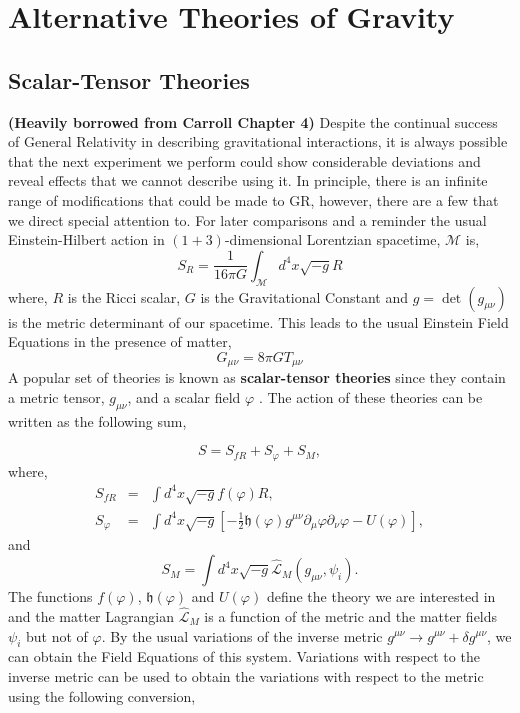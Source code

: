 \chapter{Alternative Theories of Gravity}
\section{Scalar-Tensor Theories}
\textbf{(Heavily borrowed from Carroll Chapter 4)} Despite the continual success of General Relativity in describing gravitational interactions, it is always possible that the next experiment we perform could show considerable deviations and reveal effects that we cannot describe using it. In principle, there is an infinite range of modifications that could be made to GR, however, there are a few that we direct special attention to. For later comparisons and a reminder the usual Einstein-Hilbert action in $(1+3)$-dimensional Lorentzian spacetime, $\mathcal{M}$ is,
\begin{equation}
    S_{R} = \frac{1}{16\pi G}\int_{\mathcal{M}} d^4 x\sqrt{-g}R
\end{equation}
where, $R$ is the Ricci scalar, $G$ is the Gravitational Constant and $g = \det(g_{\mu\nu})$ is the metric determinant of our spacetime. This leads to the usual Einstein Field Equations in the presence of matter, 
\begin{equation}\label{efes}
    G_{\mu\nu} = 8\pi GT_{\mu\nu}
\end{equation}
A popular set of theories is known as \textbf{scalar-tensor theories} since they contain a metric tensor, $g_{\mu\nu}$, and a scalar field $\varphi$ \citep{carrolGravity}. The action of these theories can be written as the following sum, 

\begin{equation}
    S = S_{fR} + S_{\varphi} + S_M,
\end{equation}
where,
\begin{eqnarray}\label{st-actions}
    S_{fR} &=& \int d^4x\sqrt{-g}f(\varphi)R,\\
    S_{\varphi} &=& \int d^4x\sqrt{-g}\left[-\frac{1}{2}\mathfrak{h}(\varphi)g^{\mu\nu}\partial_{\mu}\varphi\partial_{\nu}\varphi - U(\varphi)\right],
\end{eqnarray}
and 
\begin{equation}\label{matter-action}
    S_M = \int d^4x\sqrt{-g} \hat{\mathcal{L}}_M(g_{\mu\nu}, \psi_i).
\end{equation}
The functions $f(\varphi)$, $\mathfrak{h}(\varphi)$ and $U(\varphi)$ define the theory we are interested in and the matter Lagrangian $\hat{\mathcal{L}}_M$ is a function of the metric and the matter fields $\psi_i$ but not of $\varphi$. By the usual variations of the inverse metric $g^{\mu\nu} \rightarrow g^{\mu\nu}  + \delta g^{\mu\nu} $, we can obtain the Field Equations of this system. Variations with respect to the inverse metric can be used to obtain the variations with respect to the metric using the following conversion,

